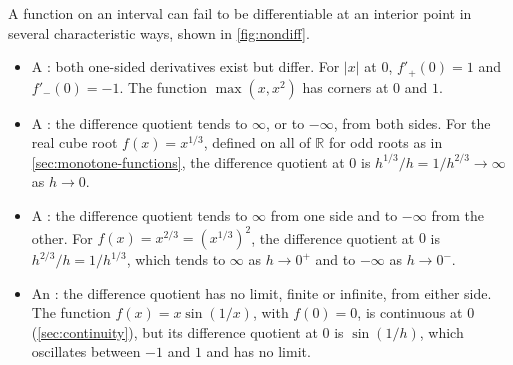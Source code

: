 A function on an interval can fail to be differentiable at an interior point in several characteristic ways, shown in \cref{fig:nondiff}.
\begin{itemize}
\item A : both one-sided derivatives exist but differ. For $|x|$ at $0$, $f'_+(0)=1$ and $f'_-(0)=-1$. The function $\max(x,x^2)$ has corners at $0$ and $1$.
\item A : the difference quotient tends to $\infty$, or to $-\infty$, from both sides. For the real cube root $f(x)=x^{1/3}$, defined on all of $\mathbb R$ for odd roots as in \cref{sec:monotone-functions}, the difference quotient at $0$ is $h^{1/3}/h=1/h^{2/3}\to\infty$ as $h\to0$.
\item A : the difference quotient tends to $\infty$ from one side and to $-\infty$ from the other. For $f(x)=x^{2/3}=(x^{1/3})^2$, the difference quotient at $0$ is $h^{2/3}/h=1/h^{1/3}$, which tends to $\infty$ as $h\to0^+$ and to $-\infty$ as $h\to0^-$.
\item An : the difference quotient has no limit, finite or infinite, from either side. The function $f(x)=x\sin(1/x)$, with $f(0)=0$, is continuous at $0$ (\cref{sec:continuity}), but its difference quotient at $0$ is $\sin(1/h)$, which oscillates between $-1$ and $1$ and has no limit.
\end{itemize}

